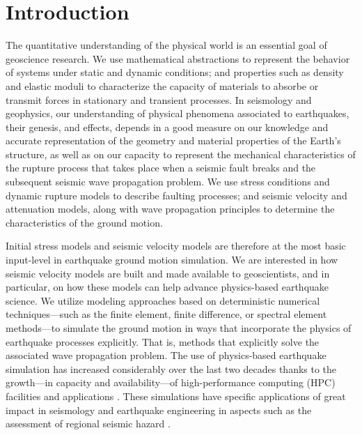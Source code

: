 
\section{Introduction}
\label{sec:introduction}

The quantitative understanding of the physical world is an essential goal of geoscience research. We use mathematical abstractions to represent the behavior of systems under static and dynamic conditions; and properties such as density and elastic moduli to characterize the capacity of materials to absorbe or transmit forces in stationary and transient processes. In seismology and geophysics, our understanding of physical phenomena associated to earthquakes, their genesis, and effects, depends in a good measure on our knowledge and accurate representation of the geometry and material properties of the Earth's structure, as well as on our capacity to represent the mechanical characteristics of the rupture process that takes place when a seismic fault breaks and the subsequent seismic wave propagation problem. We use stress conditions and dynamic rupture models to describe faulting processes; and seismic velocity and attenuation models, along with wave propagation principles to determine the characteristics of the ground motion.

Initial stress models and seismic velocity models are therefore at the most basic input-level in earthquake ground motion simulation. We are interested in how seismic velocity models are built and made available to geoscientists, and in particular, on how these models can help advance physics-based earthquake science. We utilize modeling approaches based on deterministic numerical techniques---such as the finite element, finite difference, or spectral element methods---to simulate the ground motion in ways that incorporate the physics of earthquake processes explicitly. That is, methods that explicitly solve the associated wave propagation problem. The use of physics-based earthquake simulation has increased considerably over the last two decades thanks to the growth---in capacity and availability---of high-performance computing (HPC) facilities and applications \citep[e.g.,][]{Aagaard_2008_BSSA2, Olsen_2009_GRL, Bielak_2010_GJI, Cui_2010_Proc}. These simulations have specific applications of great impact in seismology and earthquake engineering in aspects such as the assessment of regional seismic hazard \citep[e.g.,][]{Graves_2011_PAG}.

